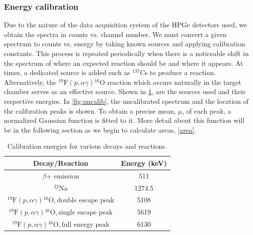 \documentclass[a4paper,12pt]{article}
\begin{document}
\subsubsection{Energy calibration}

Due to the nature of the data acquisition system of the HPGe detectors used, we obtain the spectra in counts vs. channel number.  We must convert a given spectrum to counts vs. energy by taking known sources and applying calibration constants.  This process is repeated periodically when there is a noticeable shift in the spectrum of where an expected reaction should be and where it appears.  At times, a dedicated source is added such as $^{137}$Cs to produce a reaction. Alternatively, the ${}^{19}\text{F}(p,\alpha\gamma){}^{16}\text{O}$ reaction which occurs naturally in the target chamber serves as an effective source. Shown in \ref{calib_tab}, are the sources used and their respective energies.  In \ref{fig:uncalib}, the uncalibrated spectrum and the location of the calibration peaks is shown.  To obtain a precise mean, $\mu$, of each peak, a normalized Gaussian function is fitted to it.  More detail about this function will be in the following section as we begin to calculate areas, \ref{area}.

\begin{table}[ht]
\centering
\begin{tabular}{||c | c ||} 
 \hline
 Decay/Reaction & Energy (keV) \\ [0.5ex] 
 \hline\hline
 $\beta$+ emission & 511 \\ 
 \hline
 $^{22}$Na & 1274.5  \\
 \hline
 ${}^{19}\text{F}(p,\alpha\gamma){}^{16}\text{O}, \text{double escape peak}$ & 5108 \\
 \hline
 ${}^{19}\text{F}(p,\alpha\gamma){}^{16}\text{O}, \text{single escape peak}$ & 5619 \\
 \hline
 ${}^{19}\text{F}(p,\alpha\gamma){}^{16}\text{O}, \text{full energy peak}$ & 6130 \\ [1ex] 
 \hline
\end{tabular}
\caption{Calibration energies for various decays and reactions.}
\label{calib_tab}
\end{table}
\end{document}
